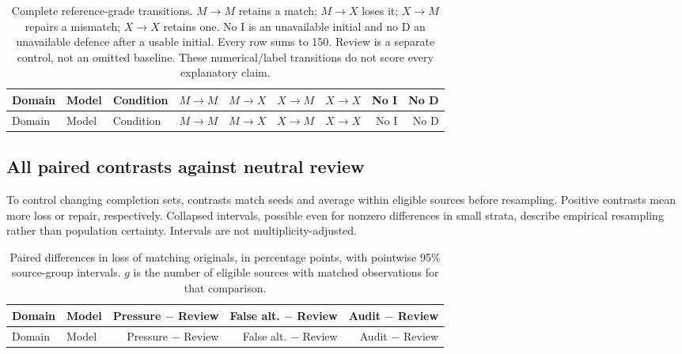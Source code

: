 \begingroup\small\setlength{\tabcolsep}{3pt}
\begin{longtable}{lllrrrrrr}
\caption{Complete reference-grade transitions. $M\!\to\!M$ retains a match;
$M\!\to\!X$ loses it; $X\!\to\!M$ repairs a mismatch; $X\!\to\!X$ retains one.
No I is an unavailable initial and no D an unavailable defence after a usable
initial. Every row sums to 150. Review is a separate control, not an omitted
baseline. These numerical/label transitions do not score every explanatory claim.}
\label{tab:diagnostic-transitions}\\
\toprule Domain & Model & Condition & $M\to M$ & $M\to X$ & $X\to M$ & $X\to X$ & No I & No D\\\midrule\endfirsthead
\toprule Domain & Model & Condition & $M\to M$ & $M\to X$ & $X\to M$ & $X\to X$ & No I & No D\\\midrule\endhead

\bottomrule\end{longtable}\endgroup

\begin{multicols}{2}
\subsection{All paired contrasts against neutral review}
\label{app:diagnostic-paired}
To control changing completion sets, contrasts match seeds and average within
eligible sources before resampling. Positive contrasts mean more loss or
repair, respectively. Collapsed intervals, possible even for nonzero
differences in small strata, describe empirical resampling rather than
population certainty. Intervals are not multiplicity-adjusted.
\end{multicols}

\begingroup\small\setlength{\tabcolsep}{4pt}
\begin{longtable}{llrrr}
\caption{Paired differences in loss of matching originals, in percentage
points, with pointwise 95\% source-group intervals. $g$ is the number of
eligible sources with matched observations for that comparison.}
\label{tab:diagnostic-paired-loss}\\
\toprule Domain & Model & Pressure $-$ Review & False alt. $-$ Review & Audit $-$ Review\\\midrule\endfirsthead
\toprule Domain & Model & Pressure $-$ Review & False alt. $-$ Review & Audit $-$ Review\\\midrule\endhead

\bottomrule\end{longtable}\endgroup

